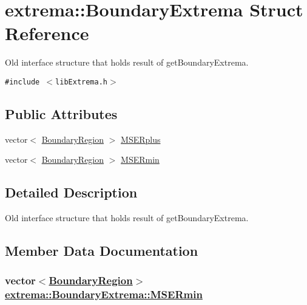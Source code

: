 \hypertarget{structextrema_1_1BoundaryExtrema}{
\section{extrema::Boundary\-Extrema Struct Reference}
\label{structextrema_1_1BoundaryExtrema}
}
Old interface structure that holds result of get\-Boundary\-Extrema.  


{\tt \#include $<$lib\-Extrema.h$>$}

\subsection*{Public Attributes}
\begin{CompactItemize}
\item 
vector$<$ \hyperlink{structextrema_1_1BoundaryRegion}{Boundary\-Region} $>$ \hyperlink{structextrema_1_1BoundaryExtrema_84384a7b9bfd20b510924728d7768375}{MSERplus}
\item 
vector$<$ \hyperlink{structextrema_1_1BoundaryRegion}{Boundary\-Region} $>$ \hyperlink{structextrema_1_1BoundaryExtrema_bdda13a85dfe65e4872c943925c14859}{MSERmin}
\end{CompactItemize}


\subsection{Detailed Description}
Old interface structure that holds result of get\-Boundary\-Extrema. 



\subsection{Member Data Documentation}
\hypertarget{structextrema_1_1BoundaryExtrema_bdda13a85dfe65e4872c943925c14859}{
\subsubsection[MSERmin]{\setlength{\rightskip}{0pt plus 5cm}vector$<$\hyperlink{structextrema_1_1BoundaryRegion}{Boundary\-Region}$>$ \hyperlink{structextrema_1_1BoundaryExtrema_bdda13a85dfe65e4872c943925c14859}{extrema::Boundary\-Extrema::MSERmin}}}
\label{structextrema_1_1BoundaryExtrema_bdda13a85dfe65e4872c943925c14859}


